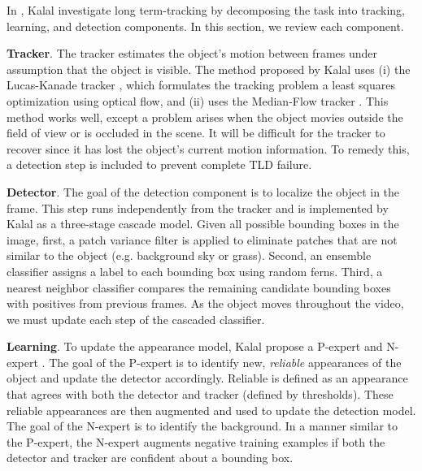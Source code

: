 \documentclass[10pt,twocolumn,letterpaper]{article}
\begin{document}
In \cite{kalal2012tracking}, Kalal \etal investigate long term-tracking by decomposing the task into tracking, learning, and detection components. In this section, we review each component.

\textbf{Tracker}.
The tracker estimates the object's motion between frames under assumption that the object is visible. The method proposed by Kalal \etal uses (i) the Lucas-Kanade tracker \cite{lucas1981iterative}, which formulates the tracking problem a least squares optimization using optical flow, and (ii) uses the Median-Flow tracker \cite{kalal2010forward}. This method works well, except a problem arises when the object movies outside the field of view or is occluded in the scene. It will be difficult for the tracker to recover since it has lost the object's current motion information. To remedy this, a detection step is included to prevent complete TLD failure.

\textbf{Detector}.
The goal of the detection component is to localize the object in the frame. This step runs independently from the tracker and is implemented by Kalal \etal as a three-stage cascade model. Given all possible bounding boxes in the image, first, a patch variance filter is applied to eliminate patches that are not similar to the object (e.g. background sky or grass). Second, an ensemble classifier assigns a label to each bounding box using random ferns. Third, a nearest neighbor classifier compares the remaining candidate bounding boxes with positives from previous frames. As the object moves throughout the video, we must update each step of the cascaded classifier.

\textbf{Learning}.
To update the appearance model, Kalal \etal propose a P-expert and N-expert \cite{kalal2012tracking, kalal2009online}. The goal of the P-expert is to identify new, \textit{reliable} appearances of the object and update the detector accordingly. Reliable is defined as an appearance that agrees with both the detector and tracker (defined by thresholds). These reliable appearances are then augmented and used to update the detection model. The goal of the N-expert is to identify the background. In a manner similar to the P-expert, the N-expert augments negative training examples if both the detector and tracker are confident about a bounding box.
\end{document}
